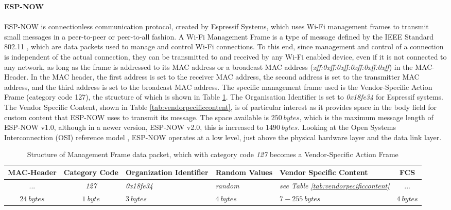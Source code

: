 \textbf{ESP-NOW}\\\\
ESP-NOW is connectionless communication protocol, created by Espressif Systems, which uses Wi-Fi management frames to transmit small messages in a peer-to-peer or peer-to-all fashion. A Wi-Fi Management Frame is a type of message defined by the IEEE Standard 802.11 \citep{noauthor_ieee_2024-1}, which are data packets used to manage and control Wi-Fi connections. To this end, since management and control of a connection is independent of the actual connection, they can be transmitted to and received by any Wi-Fi enabled device, even if it is not connected to any network, as long as the frame is addressed to its MAC address or a broadcast MAC address (\textit{xff:0xff:0xff:0xff:0xff:0xff}) in the MAC-Header. In the MAC header, the first address is set to the receiver MAC address, the second address is set to the transmitter MAC address, and the third address is set to the broadcast MAC address. The specific management frame used is the Vendor-Specific Action Frame (category code 127), the structure of which is shown in Table \ref{tab:managementframe}. The Organisation Identifier is set to \textit{0x18fe34} for Espressif systems. The Vendor Specific Content, shown in Table \ref{tab:vendorpecificcontent}, is of particular interest as it provides space in the body field for custom content that ESP-NOW uses to transmit its message. The space available is $250\ bytes$, which is the maximum message length of ESP-NOW v1.0, although in a newer version, ESP-NOW v2.0, this is increased to $1490\ bytes$. %
Looking at the Open Systems Interconnection (OSI) reference model \citep{zimmermann_osi_1980}, ESP-NOW operates at a low level, just above the physical hardware layer and the data link layer. 

\begin{table}[H]
    \centering
    \begin{tabular}{|c|c|>{\centering\arraybackslash}m{70pt}|>{\centering\arraybackslash}m{60pt}|>{\centering\arraybackslash}m{70pt}|c|}
        \hline
        \textbf{MAC-Header} & \textbf{Category Code} & \textbf{Organization Identifier} & \textbf{Random Values} & \textbf{Vendor Specific Content} & \textbf{FCS} \\
        \hline\hline
        ... & \textit{127} & \textit{0x18fe34} & \textit{random} & \textit{see Table \ref{tab:vendorpecificcontent}} & ... \\
        \hline\hline
        $24\ bytes$ & $1\ byte$ & $3\ bytes$ & $4\ bytes$ & $7-255\ bytes$ & $4\ bytes$ \\
        \hline
    \end{tabular}
    \vspace{\ftspace}
    \caption{Structure of Management Frame data packet, which with category code \textit{127} becomes a Vendor-Specific Action Frame \citep[adapted from][]{espressif_systems_esp-now_nodate}}
    \label{tab:managementframe}
\end{table}


